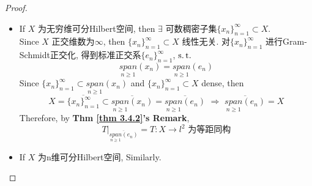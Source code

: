 \begin{thm}
		\begin{proof}
			\begin{itemize}
				\item If $X$ 为无穷维可分Hilbert空间, then $\exists$ 可数稠密子集$\{ x_n \}_{n = 1}^{\infty} \subset X$. \\
				Since $X$ 正交维数为$\infty$, then $\{ x_n \}_{n = 1}^{\infty} \subset X$ 线性无关. 对$\{ x_n \}_{n = 1}^{\infty}$ 进行Gram-Schmidt正交化, 得到标准正交系$\{ e_n \}_{n = 1}^{\infty}$, $\operatorname{s.t.}$
				\[ \underset{n \geq 1}{span} (x_n) = \underset{n \geq 1}{span} (e_n) \]
				Since $\{ x_n \}_{n = 1}^{\infty} \subset \underset{n \geq 1}{span} (x_n)$ and $\{ x_n \}_{n = 1}^{\infty} \subset X$ dense, then
				\[ X = \overline{\{ x_n \}_{n = 1}^{\infty}} \subset \overline{\underset{n \geq 1}{span} (x_n)} = \overline{\underset{n \geq 1}{span} (e_n)} \,\, \Rightarrow \,\, \overline{\underset{n \geq 1}{span} (e_n)} = X \]
				Therefore, by \textbf{Thm \ref{thm 3.4.2}'s Remark}, 
				\[ T \Big|_{\overline{\underset{n \geq 1}{span} (e_n)}} = T : X \longrightarrow l^2 \,\, \text{为等距同构} \]
				
				\vspace{4em}
				
				\item If $X$ 为n维可分Hilbert空间, Similarly.
			\end{itemize}
		\end{proof}
	\end{thm}
	
	
















	\ifx\allfiles\undefined

\fi